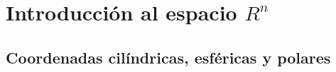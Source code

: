 \documentclass[a4paper, twoside]{article}
\newcommand{\rutapaquetes}{./paquetes-apunte}
\numberwithin{equation}{section}
\numberwithin{figure}{section}
\numberwithin{table}{section}
\begin{document}
\maketitle

\tableofcontents


\section{Introducción al espacio $R^n$}
\subsection{Coordenadas cilíndricas, esféricas y polares}
\end{document}
